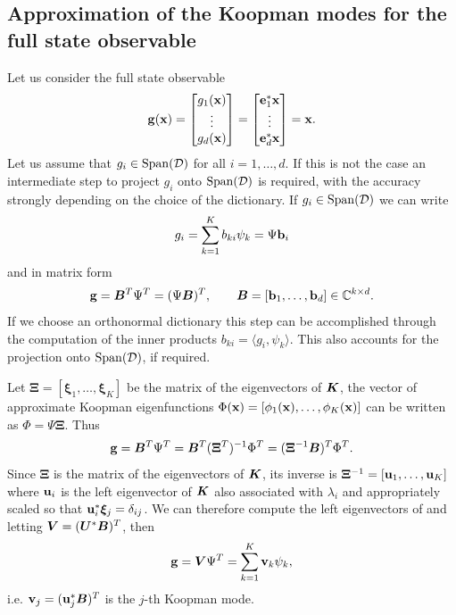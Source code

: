 \subsection{Approximation of the Koopman modes for the full state observable}
Let us consider the full state observable
\begin{equation}
    \label{full_state_def}
    \vb{g}(\vb{x}) = 
    \begin{bmatrix}
    g_1(\vb{x}) \\
    \vdots \\
    g_d(\vb{x})
    \end{bmatrix} = 
    \begin{bmatrix}
    \vb{e}_1^*\vb{x} \\
    \vdots \\
    \vb{e}_d^*\vb{x}
    \end{bmatrix} = \vb{x}.
\end{equation}
Let us assume that $g_i\in\mathrm{Span}(\mathcal{D})$ for all $i = 1,\dots,d$. If this is not the case an intermediate step to project $g_i$ onto $\mathrm{Span}(\mathcal{D})$ is required, with the accuracy strongly depending on the choice of the dictionary. If $g_i\in\mathrm{Span}(\mathcal{D})$ we can write
\begin{equation}
    g_i = \sum_{k=1}^K b_{ki}\psi_k = \Psi\vb{b}_i
\end{equation}
and in matrix form
\begin{equation*}
    \vb{g} = \vb*{B}^T\Psi^T = (\Psi\vb*{B})^T, \qquad \vb*{B} = \left[\vb{b}_1, \dots,\vb{b}_d\right]\in\mathbb{C}^{k\times d}.
\end{equation*}
If we choose an orthonormal dictionary this step can be accomplished through the computation of the inner products $b_{ki} = \langle g_i, \psi_k \rangle$. This also accounts for the projection onto $\mathrm{Span}(\mathcal{D})$, if required.

Let $\bm{\Xi} = \left[\bm{\xi}_1,\dots,\bm{\xi}_K\right]$ be the matrix of the eigenvectors of $\vb*{K}$, the vector of approximate Koopman eigenfunctions $\Phi(\vb{x}) = \left[\phi_1(\vb{x}), \dots, \phi_K(\vb{x})\right]$ can be written as $\Phi = \Psi\bm{\Xi}$. Thus
\begin{equation}
    \vb{g} = \vb*{B}^T\Psi^T = \vb*{B}^T(\bm{\Xi}^T)^{-1}\Phi^T = (\bm{\Xi}^{-1}\vb*{B})^T\Phi^T.
\end{equation}
Since $\bm{\Xi}$ is the matrix of the eigenvectors of $\vb*{K}$, its inverse is $\bm{\Xi}^{-1} = \left[\vb{u}_1, \dots, \vb{u}_K\right]$ where $\vb{u}_i$ is the left eigenvector of $\vb*{K}$ also associated with $\lambda_i$ and appropriately scaled so that $\vb{u}_i^*\bm{\xi}_j = \delta_{ij}$. We can therefore compute the left eigenvectors of and letting  $\vb*{V} = (\vb*{U}^*\vb*{B})^T$, then
\begin{equation}
    \vb{g} = \vb*{V}\Psi^T = \sum_{k=1}^K \vb{v}_k\psi_k,
\end{equation}
i.e. $\vb{v}_j = (\vb{u}_j^*\vb*{B})^T$ is the $j$-th Koopman mode.

